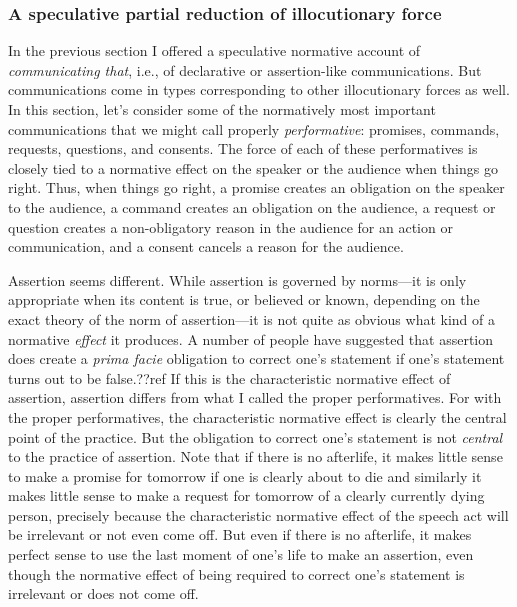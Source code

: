 \subsubsection{A speculative partial reduction of illocutionary force}
In the previous section I offered a speculative normative account of \textit{communicating that}, i.e., of declarative
or assertion-like 
communications. But communications come in types corresponding to other illocutionary forces as well. In this section, 
let's consider some of the normatively most important communications that we might call properly \textit{performative}: promises, 
commands, requests, questions, and consents. The force of each of these performatives is closely tied to a normative effect on the speaker or the audience when things go right. Thus, when things go right, a promise creates 
an obligation on the speaker to the audience, a command creates an obligation on the audience, a request or
question creates a non-obligatory reason in the audience for an action or communication, and a consent cancels a reason 
for the audience. 

Assertion seems different. While assertion is governed by norms---it is only appropriate when its content
is true, or believed or known, depending on the exact theory of the norm of assertion---it is not quite as obvious
what kind of a normative \textit{effect} it produces. A number of people have suggested that assertion does create
a \textit{prima facie} obligation to correct one's statement if one's statement turns out to be false.??ref If this is the
characteristic normative effect of assertion, assertion differs from what I called the proper performatives. For with the 
proper performatives, the characteristic normative effect is clearly the central point of the practice. But the 
obligation to correct one's statement is not \textit{central} to the practice of assertion. Note that
if there is no afterlife, it makes little sense to make a promise for tomorrow if one is clearly about to die and 
similarly it makes little sense to make a request for tomorrow of a clearly currently dying person, precisely because
the characteristic normative effect of the speech act will be irrelevant or not even come off. But even if there is 
no afterlife, it makes perfect sense to use the last moment of one's life to make an assertion, even though the
normative effect of being required to correct one's statement is irrelevant or does not come off. 

